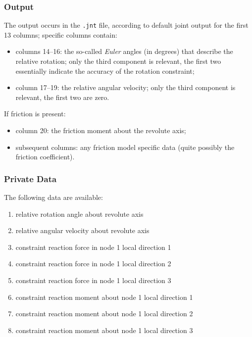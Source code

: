 \subsubsection{Output}
The output occurs in the \texttt{.jnt} file, according to default joint output
for the first 13 columns; specific columns contain:
\begin{itemize}
\item columns 14--16: the so-called \emph{Euler} angles (in degrees)
	that describe the relative rotation; only the third component
	is relevant, the first two essentially indicate the accuracy
	of the rotation constraint;
\item column 17--19: the relative angular velocity; only the third component
	is relevant, the first two are zero.
\end{itemize}
If friction is present:
\begin{itemize}
\item column 20: the friction moment about the revolute axis;
\item subsequent columns: any friction model specific data (quite possibly the friction coefficient).
\end{itemize}

\subsubsection{Private Data}
The following data are available:
\begin{enumerate}
\item {} relative rotation angle about revolute axis
\item {} relative angular velocity about revolute axis
\item {} constraint reaction force in node 1 local direction 1
\item {} constraint reaction force in node 1 local direction 2
\item {} constraint reaction force in node 1 local direction 3
\item {} constraint reaction moment about node 1 local direction 1
\item {} constraint reaction moment about node 1 local direction 2
\item {} constraint reaction moment about node 1 local direction 3
\end{enumerate}


